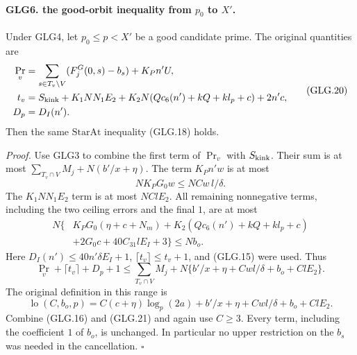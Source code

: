 \paragraph{GLG6. the good-orbit inequality from \(p_0\) to \(X'\).}
\label{claim:GLG6}
Under GLG4, let \(p_0\le p<X'\) be a good candidate prime.
The original quantities are
\[
 \begin{split}
 \Pr_v&=\sum_{s\in T_v\setminus V}(F_j^G(0,s)-b_s)+K_Pn'U,\\
 t_v&=S_{\rm kink}+K_1NN_1E_2
            +K_2N(Qc_6(n')+kQ+kl_p+c)+2n'c,\\
 D_p&=D_I(n').
 \end{split}                                                       \tag{GLG.20}
\]
Then the same \(\mathrm{StarAt}\) inequality (GLG.18) holds.

\emph{Proof.}
Use GLG3 to combine the first term of \(\Pr_v\) with
\(S_{\rm kink}\). Their sum is at most
\(\sum_{T_v\cap V}M_j+N(b'/x+\eta)\).
The term \(K_Pn'w\) is at most
\[
 NK_PG_0w\le NCw\,l/\delta.
 \]
The \(K_1NN_1E_2\) term is at most \(NClE_2\).
All remaining nonnegative terms, including the two ceiling
errors and the final \(1\), are at most
\[
 \begin{split}
 N\{&K_PG_0(\eta+c+N_m)
       +K_2(Qc_6(n')+kQ+kl_p+c)\\
       &+2G_0c+40C_{31}lE_I+3\}\le Nb_o.
 \end{split}
 \]
Here \(D_I(n')\le40n'\delta E_I+1\),
\(\lceil t_v\rceil\le t_v+1\), and (GLG.15) were used.
Thus
\[
 \Pr_v+\lceil t_v\rceil+D_p+1
 \le \sum_{T_v\cap V}M_j
       +N\{b'/x+\eta+Cwl/\delta+b_o+ClE_2\}.                      \tag{GLG.21}
\]
The original definition in this range is
\[
 \operatorname{lo}(C,b_o,p)
   =C(c+\eta)\log_p(2a)+b'/x+\eta+Cwl/\delta+b_o+ClE_2 .
 \]
Combine (GLG.16) and (GLG.21) and again use \(C\ge3\).
Every term, including the coefficient \(1\) of \(b_o\), is
unchanged. In particular no upper restriction on the \(b_s\)
was needed in the cancellation.
\hfill\(\square\)

